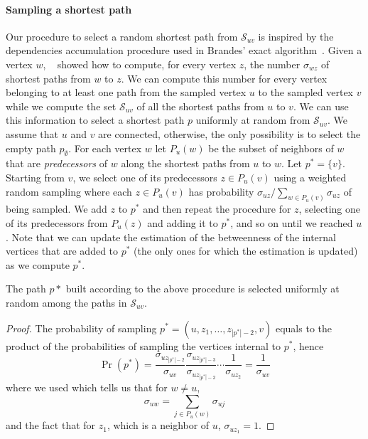 \paragraph{Sampling a shortest path}
Our procedure to select a random shortest path from $\mathcal{S}_{uv}$ is
inspired by the dependencies accumulation procedure used in Brandes' exact
algorithm~\citep{Brandes01}. Given a vertex $w$, ~\citet{Brandes01} showed how
to compute, for every vertex $z$, the number $\sigma_{wz}$ of shortest paths
from $w$ to $z$. We can compute this number for every vertex belonging to at
least one path from the sampled vertex $u$ to the sampled vertex $v$ while we
compute the set $\mathcal{S}_{uv}$ of all the shortest paths from $u$ to $v$. We
can use this information to select a shortest path $p$ uniformly at random from
$\mathcal{S}_{uv}$. We assume that $u$ and $v$ are connected, otherwise, the
only possibility is to select the empty path $p_\emptyset$. For each vertex $w$
let $P_u(w)$ be the subset of neighbors of $w$ that are \emph{predecessors} of
$w$ along the shortest paths from $u$ to $w$. Let $p^*=\{v\}$. Starting from $v$,
we select one of its predecessors $z\in P_u(v)$ using a weighted random sampling
where each $z\in P_u(v)$ has probability $\sigma_{uz}/\sum_{w\in
P_u(v)}\sigma_{uz}$ of being sampled. We add $z$ to $p^*$ and  then repeat the
procedure for $z$, selecting one of its predecessors from $P_u(z)$ and adding it
to $p^*$, and so on until we reached $u$. Note that we can update the estimation
of the betweenness of the internal vertices that are added to $p^*$ (the only
ones for which the estimation is updated) as we compute $p^*$.

\begin{lemma}
  The path $p*$ built according to the above procedure is selected uniformly at
  random among the paths in $\mathcal{S}_{uv}$.
\end{lemma}
\begin{proof}
  The probability of sampling $p^*=(u,z_1,\dotsc,z_{|p^*|-2},v)$ equals to the
  product of the probabilities of sampling the vertices internal to $p^*$, hence
  \[
  \Pr(p^*)=\frac{\sigma_{uz_{|p^*|-2}}}{\sigma_{uv}}\frac{\sigma_{uz_{|p^*|-3}}}{\sigma_{uz_{|p^*|-2}}}\dotsb
  \frac{1}{\sigma_{uz_2}}=\frac{1}{\sigma_{uv}}
  \]
  where we used \citep[Lemma3]{Brandes01} which tells us that for $w\neq u$,
  \[
  \sigma_{uw}=\sum_{j\in P_u(w)}\sigma_{uj}
  \]
  and the fact that for $z_1$, which is a neighbor of $u$, $\sigma_{uz_1}=1$.
\end{proof}

